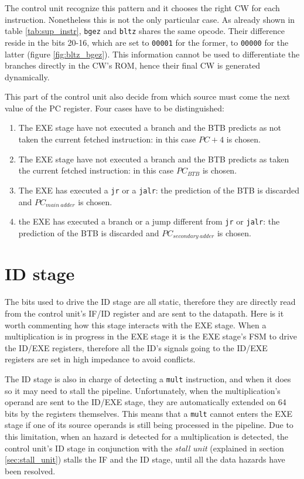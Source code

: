 The control unit recognize this pattern and it chooses the right CW for each instruction. Nonetheless this is not the only particular case. As already shown in table \ref{tab:sup_instr},
\verb|bgez| and \verb|bltz| shares the same opcode. Their difference reside in the bits 20-16, which are set to \verb|00001| for the former, to \verb|00000| for the latter (figure \ref{fig:bltz_bgez}).
This information cannot be used to differentiate the branches directly in the CW's ROM, hence their final CW is generated dynamically.

This part of the control unit also decide from which source must come the next value of the PC register. Four cases have to be distinguished:

\begin{enumerate}
    \item The EXE stage have not executed a branch and the BTB predicts as not taken the current fetched instruction: in this case $PC + 4$ is chosen.
    \item The EXE stage have not executed a branch and the BTB predicts as taken the current fetched instruction: in this case $PC_{BTB}$ is chosen.
    \item The EXE has executed a \verb|jr| or a \verb|jalr|: the prediction of the BTB is discarded and $PC_{main\ adder}$ is chosen.
    \item the EXE has executed a branch or a jump different from \verb|jr| or \verb|jalr|: the prediction of the BTB is discarded and $PC_{secondary\ adder}$ is chosen.
\end{enumerate}

\section{ID stage}

The bits used to drive the ID stage are all static, therefore they are directly read from the control unit's IF/ID register and are sent to the datapath. Here is it worth commenting
how this stage interacts with the EXE stage. When a multiplication is in progress in the EXE stage it is the EXE stage's FSM to drive the ID/EXE registers, therefore all the ID's signals
going to the ID/EXE registers are set in high impedance to avoid conflicts.

The ID stage is also in charge of detecting a \verb|mult| instruction, and when it does so it may need to stall the pipeline. Unfortunately, when the multiplication's operand are sent to the
ID/EXE stage, they are automatically extended on 64 bits by the registers themselves. This means that a \verb|mult| cannot enters the EXE stage if one of its source operands is still being processed
in the pipeline. Due to this limitation, when an hazard is detected for a multiplication is detected, the control unit's ID stage in conjunction with the {\it stall unit} (explained in section \ref{sec:stall_unit})
stalls the IF and the ID stage, until all the data hazards have been resolved.

